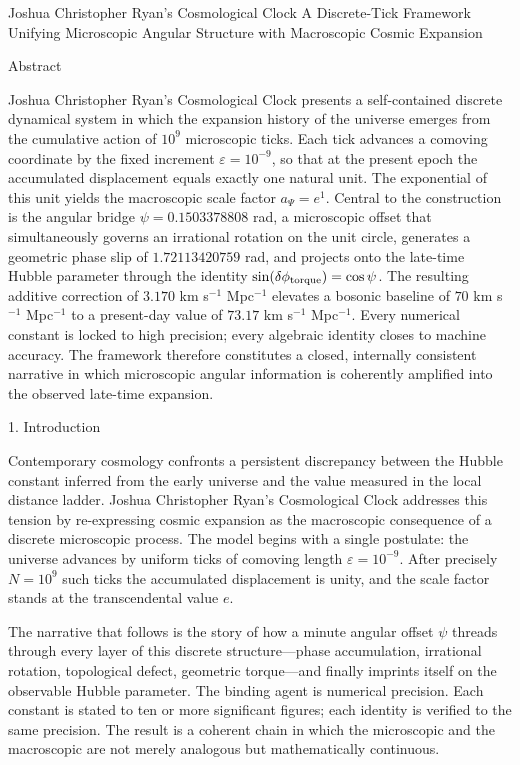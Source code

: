 Joshua Christopher Ryan’s Cosmological Clock  
A Discrete-Tick Framework Unifying Microscopic Angular Structure with Macroscopic Cosmic Expansion

Abstract

Joshua Christopher Ryan’s Cosmological Clock presents a self-contained discrete dynamical system in which the expansion history of the universe emerges from the cumulative action of \(10^{9}\) microscopic ticks. Each tick advances a comoving coordinate by the fixed increment \(\varepsilon=10^{-9}\), so that at the present epoch the accumulated displacement equals exactly one natural unit. The exponential of this unit yields the macroscopic scale factor \(a_{\Psi}=e^{1}\). Central to the construction is the angular bridge \(\psi=0.1503378808\) rad, a microscopic offset that simultaneously governs an irrational rotation on the unit circle, generates a geometric phase slip of \(1.72113420759\) rad, and projects onto the late-time Hubble parameter through the identity \(\sin(\delta\phi_{\rm torque})=\cos\psi\). The resulting additive correction of \(3.170\) km s\(^{-1}\) Mpc\(^{-1}\) elevates a bosonic baseline of \(70\) km s\(^{-1}\) Mpc\(^{-1}\) to a present-day value of \(73.17\) km s\(^{-1}\) Mpc\(^{-1}\). Every numerical constant is locked to high precision; every algebraic identity closes to machine accuracy. The framework therefore constitutes a closed, internally consistent narrative in which microscopic angular information is coherently amplified into the observed late-time expansion.

1. Introduction

Contemporary cosmology confronts a persistent discrepancy between the Hubble constant inferred from the early universe and the value measured in the local distance ladder. Joshua Christopher Ryan’s Cosmological Clock addresses this tension by re-expressing cosmic expansion as the macroscopic consequence of a discrete microscopic process. The model begins with a single postulate: the universe advances by uniform ticks of comoving length \(\varepsilon=10^{-9}\). After precisely \(N=10^{9}\) such ticks the accumulated displacement is unity, and the scale factor stands at the transcendental value \(e\).  

The narrative that follows is the story of how a minute angular offset \(\psi\) threads through every layer of this discrete structure—phase accumulation, irrational rotation, topological defect, geometric torque—and finally imprints itself on the observable Hubble parameter. The binding agent is numerical precision. Each constant is stated to ten or more significant figures; each identity is verified to the same precision. The result is a coherent chain in which the microscopic and the macroscopic are not merely analogous but mathematically continuous.

